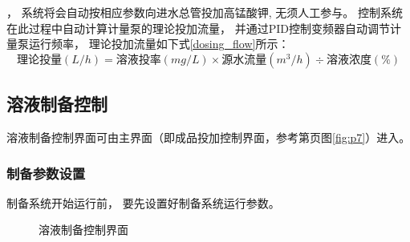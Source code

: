 \documentclass[UTF8,a4paper,12pt,titlepage]{ctexart}
\begin{document}
            ，
            系统将会自动按相应参数向进水总管投加高锰酸钾,
            无须人工参与。
            控制系统在此过程中自动计算计量泵的理论投加流量，
            并通过PID控制变频器自动调节计量泵运行频率，
            理论投加流量如下式\ref*{dosing_flow}所示：
         \begin{equation}
            \label{dosing_flow}
            \mbox{理论投量}(L/h) = \mbox{溶液投率}(mg/L)  \times \mbox{源水流量} (m^3/h) \div \mbox{溶液浓度} (\%)
         \end{equation}


   \subsection{溶液制备控制}
       溶液制备控制界面可由主界面（即成品投加控制界面，参考第\pageref{fig:p7}页图\ref{fig:p7}）进入。

      \subsubsection{制备参数设置}
      制备系统开始运行前，
      要先设置好制备系统运行参数。

      \begin{figure}[h]
         \centering
         \caption{溶液制备控制界面}\label{fig:p8}
      \end{figure}
\end{document}

